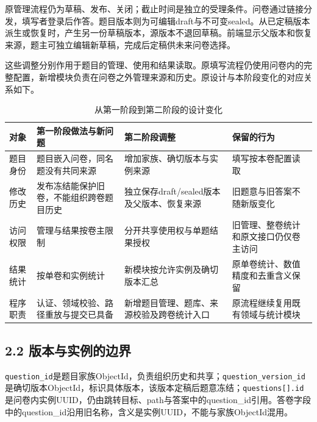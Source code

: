 原管理流程仍为草稿、发布、关闭；截止时间是独立的受理条件。问卷通过链接分发，填写者登录后作答。题目版本则为可编辑draft与不可变sealed。从已定稿版本派生或恢复时，产生另一份草稿版本，源版本不退回草稿。前端显示父版本和恢复来源，题主可独立编辑新草稿，完成后定稿供未来问卷选择。

这些调整分别作用于题目的管理、使用和结果读取。原填写流程仍使用问卷内的完整配置，新增模块负责在问卷之外管理来源和历史。原设计与本阶段变化的对应关系如下。

\begin{table}[t]
\centering\small
\caption{从第一阶段到第二阶段的设计变化}
\label{tab:evolution}
\setlength{\tabcolsep}{4pt}
\renewcommand{\arraystretch}{1.18}
\begin{tabularx}{\linewidth}{@{}>{\hsize=0.48000\hsize\raggedright\arraybackslash}X>{\hsize=1.20000\hsize\raggedright\arraybackslash}X>{\hsize=1.24000\hsize\raggedright\arraybackslash}X>{\hsize=1.08000\hsize\raggedright\arraybackslash}X@{}}
\toprule
对象 & 第一阶段做法与新问题 & 第二阶段调整 & 保留的行为\\
\midrule
题目身份 & 题目嵌入问卷，同名题没有共同来源 & 增加家族、确切版本与实例来源 & 填写按本卷配置读取\\
修改历史 & 发布冻结能保护旧卷，不能组织跨卷题目历史 & 独立保存draft/sealed版本及父版本、恢复来源 & 旧题意与旧答案不随新版变化\\
访问权限 & 管理与结果按卷主限制 & 分开共享使用权与单题结果授权 & 旧管理、整卷统计和原文接口仍仅卷主访问\\
结果统计 & 按单卷和实例统计 & 新模块按允许实例及确切版本汇总 & 原单卷统计、数值精度和去重含义保留\\
程序职责 & 认证、领域校验、路径重放与提交已具备 & 新增题目管理、题库、来源校验及跨卷统计入口 & 原流程继续复用既有领域与统计模块\\
\bottomrule
\end{tabularx}
\end{table}

\subsection{2.2 版本与实例的边界}\label{ux7248ux672cux4e0eux5b9eux4f8bux7684ux8fb9ux754c}

\nolinkurl{question_id}是题目家族ObjectId，负责组织历史和共享；\nolinkurl{question_version_id}是确切版本ObjectId，标识具体版本，该版本定稿后题意冻结；\nolinkurl{questions[].id}是问卷内实例UUID，仍由跳转目标、path与答案中的question\_id引用。答卷字段中的question\_id沿用旧名称，含义是实例UUID，不能与家族ObjectId混用。

